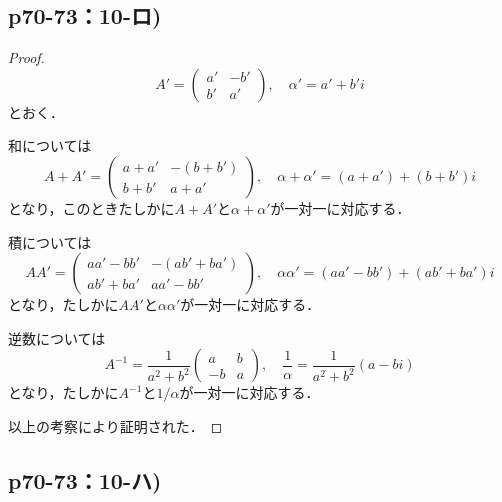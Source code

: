 \documentclass[uplatex,dvipdfmx,a4paper,11pt,fleqn]{jsarticle}
\begin{document}
\newpage 


\subsection*{p70-73：10-ロ)}

\begin{tleftbar}
    \begin{proof}
    \[
        A' = \begin{pmatrix} a' & -b' \\ b' & a' \end{pmatrix} , \quad \alpha ' = a' + b' i
    \]
    とおく．

    和については
    \[
        A+A' = \begin{pmatrix} a+a' & -(b+b') \\ b+b' & a+a' \end{pmatrix} , \quad \alpha + \alpha ' = (a+a') + (b+b') i
    \]
    となり，このときたしかに$A+A'$と$\alpha + \alpha '$が一対一に対応する．

    積については
    \[
        A A' = \begin{pmatrix} a a' - b b' & - (a b' + b a') \\ a b' + b a' & a a' - b b' \end{pmatrix} , \quad \alpha \alpha ' = (a a' - b b') + (a b' + b a') i
    \]
    となり，たしかに$AA'$と$\alpha \alpha '$が一対一に対応する．

    逆数については
    \[
        A^{-1} = \frac{1}{a^2+b^2} \begin{pmatrix} a & b \\ -b & a \end{pmatrix},\quad \frac{1}{\alpha} = \frac{1}{a^2+b^2}(a -bi )
    \]
    となり，たしかに$A^{-1}$と$1/\alpha$が一対一に対応する．

    以上の考察により証明された．
    \end{proof}
\end{tleftbar}


\subsection*{p70-73：10-ハ)}
\end{document}
